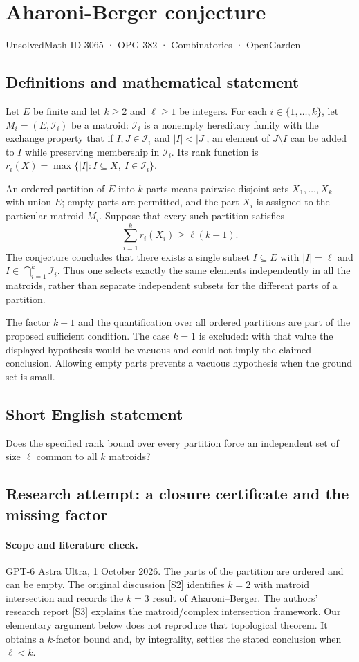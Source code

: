 \documentclass[11pt,a4paper]{article}
\begin{document}
\section*{Aharoni-Berger conjecture}\label{3065}
{\small UnsolvedMath ID 3065 · OPG-382 · Combinatorics · OpenGarden}
\subsection{Definitions and mathematical statement}
Let $E$ be finite and let $k\ge2$ and $\ell\ge1$ be integers.
For each $i\in\{1,\ldots,k\}$, let $M_i=(E,\mathcal I_i)$ be a matroid:
$\mathcal I_i$ is a nonempty hereditary family with the exchange property
that if $I,J\in\mathcal I_i$ and $|I|<|J|$, an element of $J\setminus I$
can be added to $I$ while preserving membership in $\mathcal I_i$.
Its rank function is
$r_i(X)=\max\{|I|:I\subseteq X,\ I\in\mathcal I_i\}$.

An ordered partition of $E$ into $k$ parts means pairwise disjoint sets
$X_1,\ldots,X_k$ with union $E$; empty parts are permitted, and the part
$X_i$ is assigned to the particular matroid $M_i$.
Suppose that every such partition satisfies
\[
 \sum_{i=1}^k r_i(X_i)\ge\ell(k-1).
\]
The conjecture concludes that there exists a single subset $I\subseteq E$
with $|I|=\ell$ and $I\in\bigcap_{i=1}^k\mathcal I_i$.
Thus one selects exactly the same elements independently in all the
matroids, rather than separate independent subsets for the different
parts of a partition.

The factor $k-1$ and the quantification over all ordered partitions are
part of the proposed sufficient condition. The case $k=1$ is excluded:
with that value the displayed hypothesis would be vacuous and could
not imply the claimed conclusion. Allowing empty parts prevents a
vacuous hypothesis when the ground set is small.
\subsection{Short English statement}
Does the specified rank bound over every partition force an independent set of size $\ell$ common to all $k$ matroids?
\subsection{Research attempt: a closure certificate and the missing factor}
\paragraph{Scope and literature check.}
GPT-6 Astra Ultra, 1 October 2026. The parts of the partition are
ordered and can be empty. The original discussion [S2] identifies
$k=2$ with matroid intersection and records the $k=3$ result of
Aharoni--Berger. The authors' research report [S3] explains the
matroid/complex intersection framework. Our elementary argument below
does not reproduce that topological theorem. It obtains a $k$-factor
bound and, by integrality, settles the stated conclusion when $\ell<k$.
\end{document}
